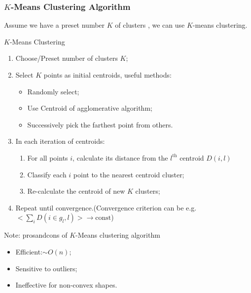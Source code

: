 \subsubsection{$ K $-Means Clustering Algorithm}
    Assume we have a preset number $ K $ of clusters , we can use $ K $-means clustering.
\begin{algorithm}{$ K $-Means Clustering}
    \begin{enumerate}[topsep=2pt,itemsep=2pt]
        \item Choose/Preset number of clusters $ K $;
        \item Select $ K $ points as initial centroids, useful methods:
        \begin{itemize}[topsep=2pt,itemsep=2pt]
            \item Randomly select;
            \item Use Centroid of agglomerative algorithm;
            \item Successively pick the farthest point from others. 
        \end{itemize}
        \item In each iteration of centroids:
        \begin{enumerate}[topsep=2pt,itemsep=2pt]
            \item For all points $ i $, calculate its distance from the $ l^\mathrm{th} $ centroid $ D(i,l) $
            \item Classify each $ i $ point to the nearest centroid cluster;
            \item Re-calculate the centroid of new $ K $ clusters;
        \end{enumerate}
        \item Repeat until convergence.(Convergence criterion can be e.g. $ <\sum_i D(i\in g_l,l)>\to \mathrm{const} $)
    \end{enumerate}
\end{algorithm}
    





Note: pros­and­cons of $ K $-Means clustering algorithm
\begin{itemize}[topsep=2pt,itemsep=2pt]
    \item Efficient:$ \sim O(n) $;
    \item Sensitive to outliers;
    \item Ineffective for non-convex shapes.
\end{itemize}

